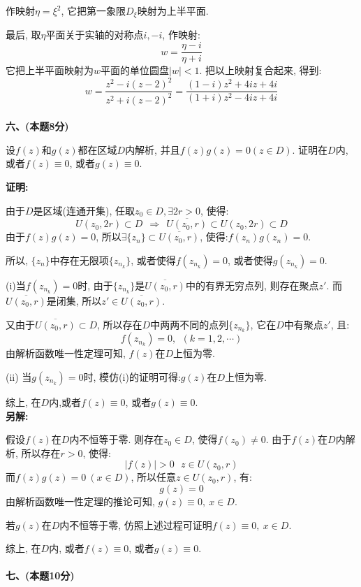 \documentclass{article}
\begin{document}
作映射$\eta = \xi^2$, 它把第一象限$D_{\xi}$映射为上半平面.

最后, 取$\eta$平面关于实轴的对称点$i, -i$, 作映射:
$$ w = \dfrac{\eta - i}{\eta + i} $$
它把上半平面映射为$w$平面的单位圆盘$|w|<1$. 把以上映射复合起来, 得到:
$$ w = \dfrac{z^2 - i(z-2)^2}{z^2 + i(z-2)^2} = \dfrac{(1-i)z^2 + 4iz + 4i}{(1+i)z^2 - 4iz + 4i} $$ \\

\textbf{六、(本题8分)}

设$f(z)$和$g(z)$都在区域$D$内解析, 并且$f(z)g(z) = 0 (z \in D)$. 证明在$D$内, 或者$f(z) \equiv 0$, 或者$g(z) \equiv 0$. 

\textbf{证明:} 

由于$D$是区域(连通开集), 任取$z_0 \in D, \exists 2r >0$, 使得:
$$ U(z_0, 2r) \subset D \ \ \Rightarrow \ \ \overline{U(z_0, r)} \subset  U(z_0, 2r) \subset D   $$
由于$f(z)g(z) = 0$, 所以$\exists \{z_n  \} \subset \overline{U(z_0, r)}$, 使得:$f(z_n)g(z_n) = 0$.

所以, $\{z_n \}$中存在无限项$\{z_{n_k}  \}$, 或者使得$f(z_{n_k}) = 0$, 或者使得$g(z_{n_k}) = 0$.

(i)当$f(z_{n_k}) = 0$时, 由于$\{ z_{n_k} \}$是$\overline{U(z_0, r)}$中的有界无穷点列, 则存在聚点$z'$. 而$ \overline{U(z_0, r)}$是闭集, 所以$z' \in \overline{U(z_0, r)}$.

又由于$ \overline{U(z_0, r)} \subset D$, 所以存在$D$中两两不同的点列$\{z_{n_k} \}$, 它在$D$中有聚点$z'$, 且:
$$ f(z_{n_k}) = 0, \ \ ( k=1,2,\cdots) $$
由解析函数唯一性定理可知, $f(z)$在$D$上恒为零.

(ii) 当$g(z_{n_k})=0$时, 模仿(i)的证明可得:$g(z)$在$D$上恒为零. 

综上, 在$D$内,或者$f(z) \equiv 0$, 或者$g(z) \equiv 0$. \\  

\textbf{另解:}

假设$f(z)$在$D$内不恒等于零. 则存在$z_0 \in D$, 使得$f(z_0) \neq 0 $. 由于$f(z)$在$D$内解析, 所以存在$r > 0$, 使得:
$$ |f(z)| > 0 \ \ \ z \in U(z_0, r)  $$
而$f(z)g(z) = 0 \ (x \in D)$, 所以任意$z \in U(z_0, r)$, 有:
$$ g(z) = 0 $$
由解析函数唯一性定理的推论可知, $g(z) \equiv 0, \ x \in D$. 

若$g(z)$在$D$内不恒等于零, 仿照上述过程可证明$f(z) \equiv 0, \ x \in D$. 

综上, 在$D$内, 或者$f(z) \equiv 0$, 或者$g(z) \equiv 0$. \\  \\ 

\textbf{七、(本题10分)} 
\end{document}
